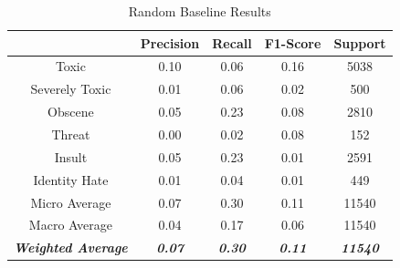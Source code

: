 \documentclass{article}
\begin{document}
{{	  \begin{table}[h!]
		  \centering
		  \begin{tabular}{|c|| c c c c|}
			  \hline
			                                     & Precision              & Recall                 & F1-Score               & Support                 \\ [0.5ex]
			  \hline\hline
			  Toxic                              & 0.10                   & 0.06                   & 0.16                   & 5038                    \\
			  Severely Toxic                     & 0.01                   & 0.06                   & 0.02                   & 500                     \\
			  Obscene                            & 0.05                   & 0.23                   & 0.08                   & 2810                    \\
			  Threat                             & 0.00                   & 0.02                   & 0.08                   & 152                     \\
			  Insult                             & 0.05                   & 0.23                   & 0.01                   & 2591                    \\
			  Identity Hate                      & 0.01                   & 0.04                   & 0.01                   & 449                     \\
			  \hline\hline
			  Micro Average                      & 0.07                   & 0.30                   & 0.11                   & 11540                   \\
			  Macro Average                      & 0.04                   & 0.17                   & 0.06                   & 11540                   \\
			  \textit{\textbf{Weighted Average}} & \textit{\textbf{0.07}} & \textit{\textbf{0.30}} & \textit{\textbf{0.11}} & \textit{\textbf{11540}} \\

			  \hline
		  \end{tabular}
		  \caption{Random Baseline Results}
		  \label{table:rand-base}
	  \end{table}
  }
 }
\end{document}
